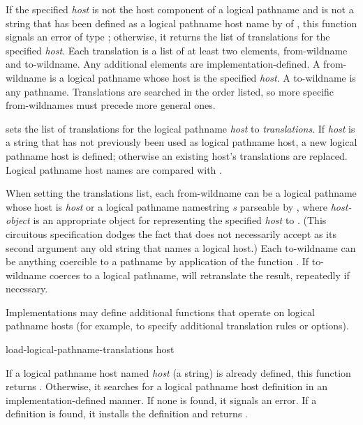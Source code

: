 \begin{newer}
\begin{defun}[Function]
    If the specified \emph{host} is not the host component of a logical pathname and is not a
    string that has been defined as a logical pathname host name by  of
    , this function signals an error of type ;
    otherwise, it returns the list of translations for the specified \emph{host}.  Each translation is
    a list of at least two elements, from-wildname and to-wildname.  Any
    additional elements are implementation-defined.  A from-wildname is a
    logical pathname whose host is the specified \emph{host}.  A to-wildname is any pathname.
    Translations are searched in the order listed, so more specific
    from-wildnames must precede more general ones.

    sets the list of translations for the logical
    pathname \emph{host} to \emph{translations}.  If \emph{host} is a string that has
    not previously been used as logical pathname host, a new logical
    pathname host is defined; otherwise an existing host's translations are
    replaced.  Logical pathname host names are compared with .

    When setting the translations list, each from-wildname can be a logical
    pathname whose host is \emph{host} or a logical pathname namestring \emph{s}
    parseable by , where \emph{host-object}
    is an appropriate object for representing the specified \emph{host} to
    .  (This circuitous specification dodges the fact
    that  does not necessarily accept as its second argument
    any old string that names a logical host.)
    Each to-wildname can be anything coercible to a pathname by application of
    the function .
    If to-wildname coerces to a logical pathname,
     will retranslate the result, repeatedly if
    necessary.

    Implementations may define additional functions that operate on
    logical pathname hosts (for example, to specify additional translation
    rules or options).
\end{defun}

\begin{defun}[Function]
load-logical-pathname-translations host

    If a logical pathname host named \emph{host} (a string) is already defined,
    this function returns .  Otherwise, it searches for a logical pathname host definition
    in an implementation-defined manner.  If none is found, it signals an
    error.  If a definition is found, it installs the definition and returns .


\end{defun}
\end{newer}
